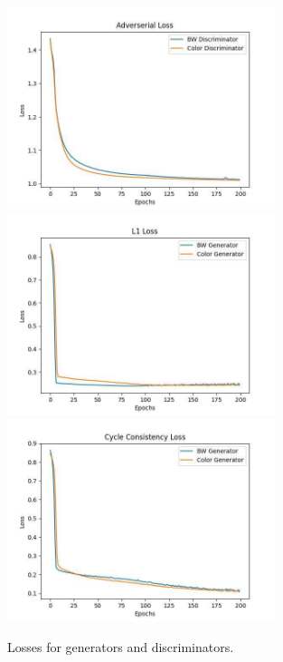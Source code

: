 \begin{figure}
    \centering
    \includegraphics[width=0.7\textwidth]{chapter/output/UNet-adver.jpg}
    \includegraphics[width=0.7\textwidth]{chapter/output/UNet-l1.jpg}
    \includegraphics[width=0.7\textwidth]{chapter/output/UNet-cyclecon.jpg}
    \caption{Losses for generators and discriminators.}
    \label{Losses for generators and discriminators.}
\end{figure}
\clearpage


